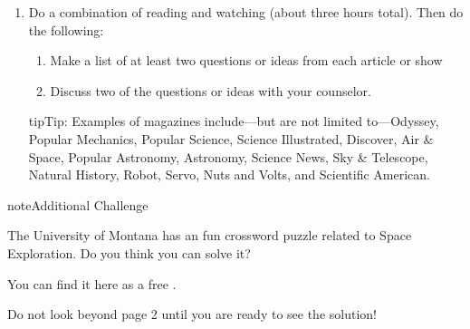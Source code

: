 \documentclass[letterpaper,10pt,english,openany,oneside]{sphinxmanual}
\begin{document}
\begin{description}
\begin{enumerate}
\begin{enumerate}
\item {} 
Discuss two of the questions or ideas with your counselor

\end{enumerate}

\begin{sphinxadmonition}{tip}{Tip:}
Examples of magazines include—but are not limited to—Odyssey, Popular Mechanics, Popular Science, Science Illustrated, Discover, Air \& Space, Popular Astronomy, Astronomy, Science News, Sky \& Telescope, Natural History, Robot, Servo, Nuts and Volts, and Scientific American.
\end{sphinxadmonition}

\item {} 
Do a combination of reading and watching (about three hours total). Then do the following:
\begin{enumerate}
%
\item {} 
Make a list of at least two questions or ideas from each article or show

\item {} 
Discuss two of the questions or ideas with your counselor.

\end{enumerate}

\begin{sphinxadmonition}{tip}{Tip:}
Examples of magazines include—but are not limited to—Odyssey, Popular Mechanics, Popular Science, Science Illustrated, Discover, Air \& Space, Popular Astronomy, Astronomy, Science News, Sky \& Telescope, Natural History, Robot, Servo, Nuts and Volts, and Scientific American.
\end{sphinxadmonition}

\end{enumerate}

\end{description}

\begin{sphinxadmonition}{note}{Additional Challenge}

The University of Montana has an fun crossword puzzle related to Space Exploration. Do you think you can solve it?

You can find it here as a free .

Do not look beyond page 2 until you are ready to see the solution!
\end{sphinxadmonition}
\end{document}
